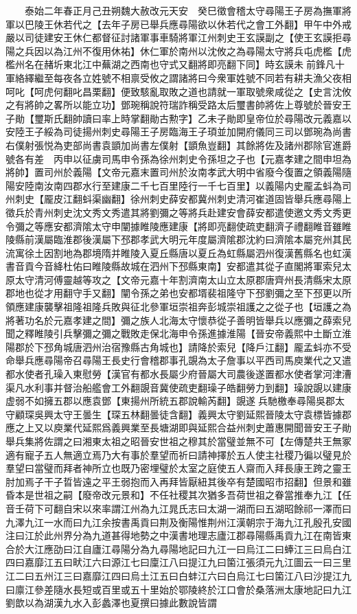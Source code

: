 　　泰始二年春正月己丑朔魏大赦改元天安　癸巳徵會稽太守尋陽王子房為撫軍將軍以巴陵王休若代之【去年子房已舉兵應尋陽欲以休若代之會工外翻】甲午中外戒嚴以司徒建安王休仁都督征討諸軍事車騎將軍江州刺史王玄謨副之【使王玄謨拒尋陽之兵因以為江州不復用休祐】休仁軍於南州以沈攸之為尋陽太守將兵屯虎檻【虎檻州名在赭圻東北江中蕪湖之西南也守式又翻將即亮翻下同】時玄謨未前鋒凡十軍絡繹繼至每夜各立姓號不相禀受攸之謂諸將曰今衆軍姓號不同若有耕夫漁父夜相呵叱【呵虎何翻叱昌栗翻】便致駭亂取敗之道也請就一軍取號衆咸從之【史言沈攸之有將帥之畧所以能立功】鄧琬稱說符瑞詐稱受路太后璽書帥將佐上尊號於晉安王子勛【璽斯氏翻帥讀曰率上時掌翻勛古勲字】乙未子勛即皇帝位於尋陽改元義嘉以安陸王子綏為司徒揚州刺史尋陽王子房臨海王子頊並加開府儀同三司以鄧琬為尚書右僕射張悦為吏部尚書袁顗加尚書左僕射【顗魚豈翻】其餘將佐及諸州郡除官進爵號各有差　丙申以征虜司馬申令孫為徐州刺史令孫坦之子也【元嘉孝建之間申坦為將帥】置司州於義陽【文帝元嘉末置司州於汝南孝武大明中省廢今復置之領義陽隨陽安陸南汝南四郡水行至建康二千七百里陸行一千七百里】以義陽内史龎孟蚪為司州刺史【龎皮江翻蚪渠幽翻】徐州刺史薛安都冀州刺史清河崔道固皆舉兵應尋陽上徵兵於青州刺史沈文秀文秀遣其將劉彌之等將兵赴建安會薛安都遣使邀文秀文秀更令彌之等應安都濟隂太守申闡據睢陵應建康【將即亮翻使疏吏翻濟子禮翻睢音雖睢陵縣前漢屬臨淮郡後漢屬下邳郡孝武大明元年度屬濟隂郡沈約曰濟隂本屬兖州其民流寓徐土因割地為郡境隋并睢陵入夏丘縣唐以夏丘為虹縣屬泗州復漢舊縣名也虹漢書音貢今音絳杜佑曰睢陵縣故城在泗州下邳縣東南】安都遣其從子直閣將軍索兒太原太守清河傅靈越等攻之【文帝元嘉十年割濟南太山立太原郡唐齊州長清縣宋太原郡地也從才用翻守手又翻】闡令孫之弟也安都壻裴祖隆守下邳劉彌之至下邳更以所領應建康襲擊祖隆祖隆兵敗與征北參軍垣崇祖奔彭城崇祖護之之從子也【垣護之為將著功名於元嘉孝建之間】彌之族人北海太守懷恭從子善明皆舉兵以應彌之薛索兒聞之釋睢陵引兵擊彌之彌之戰敗走保北海申令孫進據淮陽【晉安帝義熙中土斷立淮陽郡於下邳角城唐泗州治宿豫縣古角城也】請降於索兒【降戶江翻】龎孟蚪亦不受命舉兵應尋陽帝召尋陽王長史行會稽郡事孔覬為太子詹事以平西司馬庾業代之又遣都水使者孔璪入東慰勞【漢官有都水長屬少府晉屬大司農後遂置都水使者掌河津漕渠凡水利事并督治船艦會工外翻覬音冀使疏吏翻璪子皓翻勞力到翻】璪說覬以建康虚弱不如擁五郡以應袁鄧【東揚州所統五郡說輸芮翻】覬遂兵馳檄奉尋陽吳郡太守顧琛吳興太守王曇生【琛五林翻曇徒含翻】義興太守劉延熙晉陵太守袁標皆據郡應之上又以庾業代延熙爲義興業至長塘湖即與延熙合益州刺史蕭惠開聞晉安王子勛舉兵集將佐謂之曰湘東太祖之昭晉安世祖之穆其於當璧並無不可【左傳楚共王無冢適有寵子五人無適立焉乃大有事於羣望而祈曰請神擇於五人使主社稷乃徧以璧見於羣望曰當璧而拜者神所立也既乃密埋璧於太室之庭使五人齋而入拜長康王跨之靈王肘加焉子干子晢皆遠之平王弱抱而入再拜皆厭紐其後卒有楚國昭市招翻】但景和雖昏本是世祖之嗣【廢帝改元景和】不任社稷其次猶多吾荷世祖之眷當推奉九江【任音壬荷下可翻自宋以來率謂江州為九江晁氏志曰太湖一湖而曰五湖昭餘祁一澤而曰九澤九江一水而曰九江余按書禹貢曰荆及衡陽惟荆州江漢朝宗于海九江孔殷孔安國注曰江於此州界分為九道甚得地勢之中漢書地理志廬江郡尋陽縣禹貢九江在南皆東合於大江應劭曰江自廬江尋陽分為九尋陽地記曰九江一曰烏江二曰蜯江三曰烏白江四曰嘉靡江五曰畎江六曰源江七曰廩江八曰提江九曰箘江張須元九江圖云一曰三里江二曰五州江三曰嘉靡江四曰烏土江五曰白蚌江六曰白烏江七曰箘江八曰沙提江九曰廪江參差隨水長短或百里或五十里始於鄂陵終於江口會於桑落洲太康地記曰九江劉歆以為湖漢九水入彭蠡澤也夏撰曰據此數說皆謂